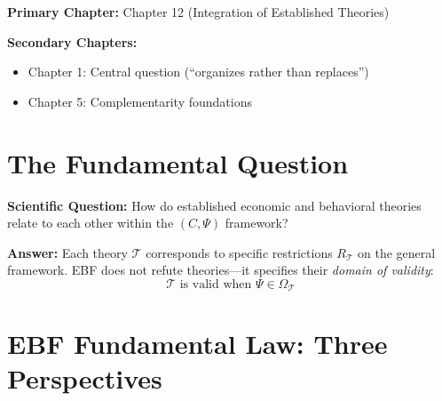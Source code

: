 \begin{tcolorbox}[colback=purple!5!white, colframe=purple!75!black,
    title=\textbf{Chapter Linkage}]

\textbf{Primary Chapter:} Chapter 12 (Integration of Established Theories)

\textbf{Secondary Chapters:}
\begin{itemize}[nosep]
    \item Chapter 1: Central question (``organizes rather than replaces'')
    \item Chapter 5: Complementarity foundations
\end{itemize}

\end{tcolorbox}

\section{The Fundamental Question}
\label{sec:ms-fundamental}

\begin{tcolorbox}[colback=red!5!white, colframe=red!75!black,
    title=\textbf{The Fundamental Question}]

\textbf{Scientific Question:} How do established economic and behavioral
theories relate to each other within the $(C, \Psi)$ framework?

\textbf{Answer:} Each theory $\mathcal{T}$ corresponds to specific restrictions
$R_\mathcal{T}$ on the general framework. EBF does not refute theories—it
specifies their \textit{domain of validity}:
\begin{equation}
\mathcal{T} \text{ is valid when } \Psi \in \Omega_\mathcal{T}
\end{equation}

\end{tcolorbox}

\section{EBF Fundamental Law: Three Perspectives}
\label{sec:ms-fundamental-law}

